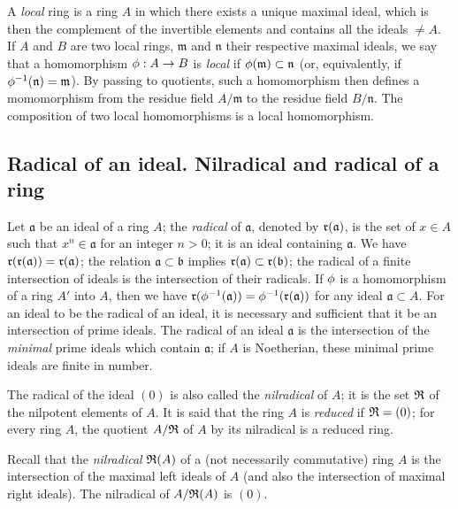\begin{env}[1.0.7]
\label{0.1.0.7}
A {\em local} ring is a ring $A$ in which there exists a unique maximal ideal,
which is then the complement of the invertible elements and contains all the
ideals $\neq A$. If $A$ and $B$ are two local rings, $\mathfrak{m}$ and
$\mathfrak{n}$ their respective maximal ideals, we say that a homomorphism
$\phi:A\to B$ is {\em local} if $\phi(\mathfrak{m})\subset\mathfrak{n}$ (or,
equivalently, if $\phi^{-1}(\mathfrak{n})=\mathfrak{m}$). By passing to
quotients, such a homomorphism then defines a momomorphism from the residue
field $A/\mathfrak{m}$ to the residue field $B/\mathfrak{n}$. The composition of
two local homomorphisms is a local homomorphism.
\end{env}

\subsection{Radical of an ideal. Nilradical and radical of a ring}
\label{subsection-radical-and-nilradical}

\begin{env}[1.1.1]
\label{0.1.1.1}
Let $\mathfrak{a}$ be an ideal of a ring $A$; the {\em radical} of
$\mathfrak{a}$, denoted by $\mathfrak{r}(\mathfrak{a})$, is the set of $x\in A$ such
that $x^n\in\mathfrak{a}$ for an integer $n>0$; it is an ideal containing
$\mathfrak{a}$. We have $\mathfrak{r}(\mathfrak{r}(\mathfrak{a}))=\mathfrak{r}(\mathfrak{a})$;
the relation $\mathfrak{a}\subset\mathfrak{b}$ implies
$\mathfrak{r}(\mathfrak{a})\subset\mathfrak{r}(\mathfrak{b})$; the radical of a finite
intersection of ideals is the intersection of their radicals. If $\phi$ is a
homomorphism of a ring $A'$ into $A$, then we have
$\mathfrak{r}(\phi^{-1}(\mathfrak{a}))=\phi^{-1}(\mathfrak{r}(\mathfrak{a}))$ for any ideal
$\mathfrak{a}\subset A$. For an ideal to be the radical of an ideal, it is
necessary and sufficient that it be an intersection of prime ideals. The radical
of an ideal $\mathfrak{a}$ is the intersection of the {\em minimal} prime
ideals which contain $\mathfrak{a}$; if $A$ is Noetherian, these minimal prime
ideals are finite in number.

The radical of the ideal $(0)$ is also called the {\em nilradical} of $A$; it
is the set $\mathfrak{R}$ of the nilpotent elements of $A$. It is said that the ring
$A$ is {\em reduced} if $\mathfrak{R}=(0)$; for every ring $A$, the quotient
$A/\mathfrak{R}$ of $A$ by its nilradical is a reduced ring.
\end{env}

\begin{env}[1.1.2]
\label{0.1.1.2}
Recall that the {\em nilradical} $\mathfrak{R}(A)$ of a (not necessarily
commutative) ring $A$ is the intersection of the maximal left ideals of $A$ (and
also the intersection of maximal right ideals). The nilradical of $A/\mathfrak{R}(A)$
is $(0)$.
\end{env}

